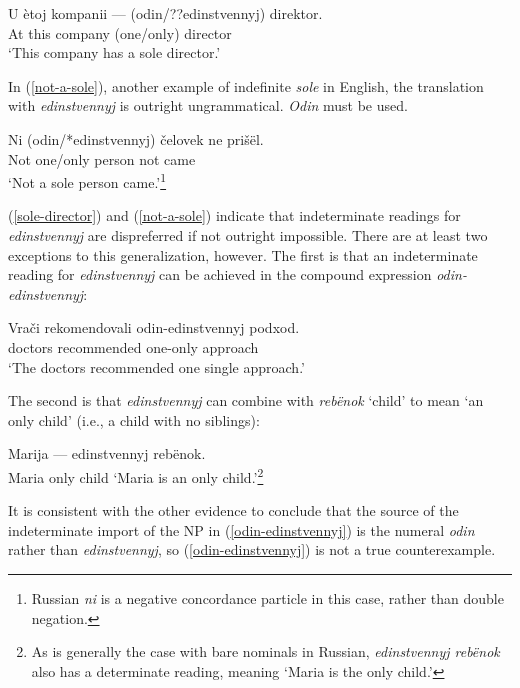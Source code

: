 \documentclass{article}
\begin{document}
\begin{exe}
	\ex \label{sole-director} \gll U \`{e}toj kompanii --- (odin/??edinstvennyj) direktor.\\
	At this company {} (one/only) director\\
	\glt `This company has a sole director.'
\end{exe}

In (\ref{not-a-sole}), another example of indefinite \textit{sole} in English, the translation with \textit{edinstvennyj} is outright ungrammatical. \textit{Odin} must be used.

\begin{exe}
	\ex \label{not-a-sole} \gll Ni (odin/*edinstvennyj) \v{c}elovek ne pri\v{s}\"{e}l.\\
	Not one/only person not came\\
	\glt `Not a sole person came.'\footnote{Russian \textit{ni} is a negative concordance particle in this case, rather than double negation.}
\end{exe}

(\ref{sole-director}) and (\ref{not-a-sole}) indicate that indeterminate readings for \textit{edinstvennyj} are dispreferred if not outright impossible. There are at least two exceptions to this generalization, however. The first is that an indeterminate reading for \textit{edinstvennyj} can be achieved in the compound expression \textit{odin-edinstvennyj}:

\begin{exe}
	\ex \label{odin-edinstvennyj} \gll Vra\v{c}i rekomendovali odin-edinstvennyj podxod.\\
	doctors recommended one-only approach\\
	`The doctors recommended one single approach.'
\end{exe}

The second is that \textit{edinstvennyj} can combine with \textit{reb\"{e}nok} `child' to mean `an only child' (i.e., a child with no siblings):

\begin{exe}
	\ex \label{only-child-ru} Marija --- edinstvennyj reb\"{e}nok.\\
	Maria {} only child
	\glt `Maria is an only child.'\footnote{As is generally the case with bare nominals in Russian, \textit{edinstvennyj reb\"{e}nok} also has a determinate reading, meaning `Maria is the only child.'}
\end{exe}

It is consistent with the other evidence to conclude that the source of the indeterminate import of the NP in (\ref{odin-edinstvennyj}) is the numeral \textit{odin} rather than \textit{edinstvennyj}, so (\ref{odin-edinstvennyj}) is not a true counterexample.
\end{document}
